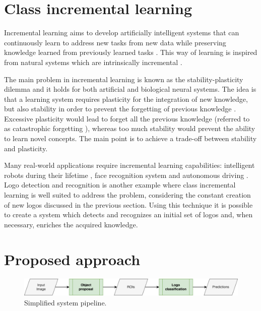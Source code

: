 \section{Class incremental learning}
Incremental learning aims to develop artificially intelligent
systems that can continuously learn to address new tasks
from new data while preserving knowledge learned from
previously learned tasks \cite{masana2020class}. This way of learning is inspired from natural systems which are intrinsically incremental \cite{wu2019large}.

The main problem in incremental learning is known as the stability-plasticity dilemma and it holds for both artificial and biological neural systems. The idea is that a learning system requires plasticity for the integration of new knowledge, but also stability in order to prevent the forgetting of previous knowledge \cite{mermillod2013stability}. Excessive plasticity would lead to forget all the previous knowledge (referred to as catastrophic forgetting \cite{grossberg2013adaptive}), whereas too much stability would prevent the ability to learn novel concepts. The main point is to achieve a trade-off between stability and plasticity. 

Many real-world applications require incremental learning capabilities: intelligent robots during their lifetime \cite{thrun1995lifelong}, face recognition system \cite{li2017incremental} and autonomous driving \cite{pierre2018incremental}. Logo detection and recognition is another example where class incremental learning is well suited to address the problem, considering the constant creation of new logos discussed in the previous section. Using this technique it is possible to create a system which detects and recognizes an initial set of logos and, when necessary, enriches the acquired knowledge.

\section{Proposed approach}

\begin{figure}
    \begin{center}
        \includegraphics[width=\columnwidth]{images/pipeline.drawio.png}
    \end{center}
    \caption{Simplified system pipeline.}
    \label{fig:system-pipeline}
\end{figure}



